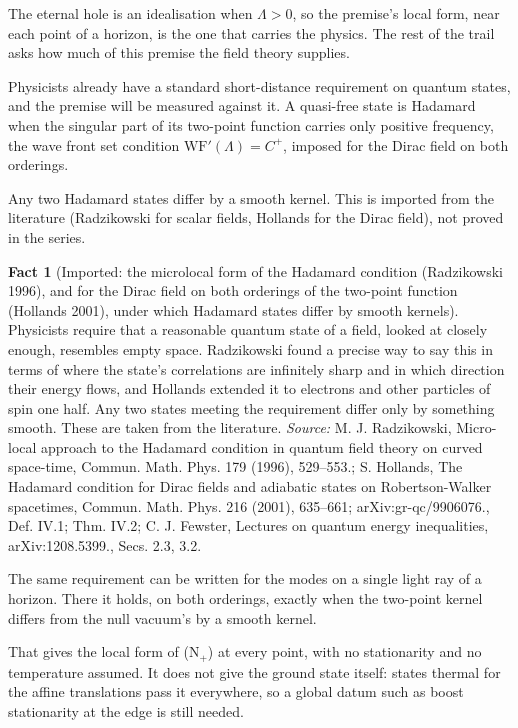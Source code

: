 \documentclass[11pt]{article}
\theoremstyle{definition}
\newtheorem{fact}[theorem]{Fact}
\theoremstyle{plain}
\begin{document}
The eternal hole is an idealisation when $\Lambda > 0$, so the premise's local form, near each point of a horizon, is the one that carries the physics. The rest of the trail asks how much of this premise the field theory supplies.

Physicists already have a standard short-distance requirement on quantum states, and the premise will be measured against it. A quasi-free state is Hadamard when the singular part of its two-point function carries only positive frequency, the wave front set condition $\mathrm{WF}'(\Lambda) = C^{+}$, imposed for the Dirac field on both orderings.

Any two Hadamard states differ by a smooth kernel. This is imported from the literature (Radzikowski for scalar fields, Hollands for the Dirac field), not proved in the series.

\begin{fact}[Imported: the microlocal form of the Hadamard condition (Radzikowski 1996), and for the Dirac field on both orderings of the two-point function (Hollands 2001), under which Hadamard states differ by smooth kernels]\label{c:synthesis.imported-microlocal-hadamard-condition}
Physicists require that a reasonable quantum state of a field, looked at closely enough, resembles empty space. Radzikowski found a precise way to say this in terms of where the state's correlations are infinitely sharp and in which direction their energy flows, and Hollands extended it to electrons and other particles of spin one half. Any two states meeting the requirement differ only by something smooth. These are taken from the literature.
\emph{Source:} M. J. Radzikowski, Micro-local approach to the Hadamard condition in quantum field theory on curved space-time, Commun. Math. Phys. 179 (1996), 529--553.; S. Hollands, The Hadamard condition for Dirac fields and adiabatic states on Robertson-Walker spacetimes, Commun. Math. Phys. 216 (2001), 635--661; arXiv:gr-qc/9906076., Def. IV.1; Thm. IV.2; C. J. Fewster, Lectures on quantum energy inequalities, arXiv:1208.5399., Secs. 2.3, 3.2.
\end{fact}

The same requirement can be written for the modes on a single light ray of a horizon. There it holds, on both orderings, exactly when the two-point kernel differs from the null vacuum's by a smooth kernel.

That gives the local form of (N$_{+}$) at every point, with no stationarity and no temperature assumed. It does not give the ground state itself: states thermal for the affine translations pass it everywhere, so a global datum such as boost stationarity at the edge is still needed.
\end{document}
